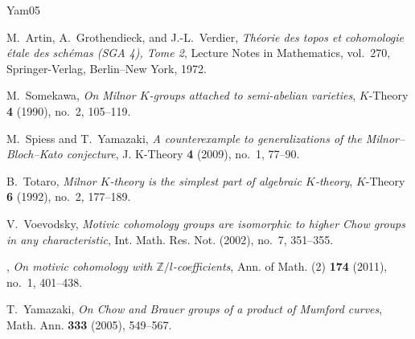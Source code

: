 \begin{thebibliography}{Yam05}


M.~Artin, A.~Grothendieck, and J.-L.~Verdier,
\emph{Th\'eorie des topos et cohomologie \'etale des sch\'emas
(SGA 4), Tome 2}, Lecture Notes in Mathematics, vol.~270,
Springer-Verlag, Berlin--New York, 1972.

M.~Somekawa, \emph{On {M}ilnor {$K$}-groups attached to semi-abelian
varieties}, $K$-Theory \textbf{4} (1990), no.~2, 105--119.

M.~Spiess and T.~Yamazaki, \emph{A counterexample to generalizations of
the {M}ilnor--{B}loch--{K}ato conjecture}, J. K-Theory \textbf{4} (2009),
no.~1, 77--90.

B.~Totaro, \emph{Milnor {$K$}-theory is the simplest part of algebraic
{$K$}-theory}, $K$-Theory \textbf{6} (1992), no.~2, 177--189.

V.~Voevodsky, \emph{Motivic cohomology groups are isomorphic to higher
{C}how groups in any characteristic}, Int. Math. Res. Not. (2002), no.~7,
351--355.

\bysame, \emph{On motivic cohomology with
{$\mathbb Z/l$}-coefficients}, Ann. of Math. (2) \textbf{174} (2011), no.~1,
401--438.

T.~Yamazaki, \emph{On {C}how and {B}rauer groups of a product of {M}umford
curves}, Math. Ann. \textbf{333} (2005), 549--567.

\end{thebibliography}
